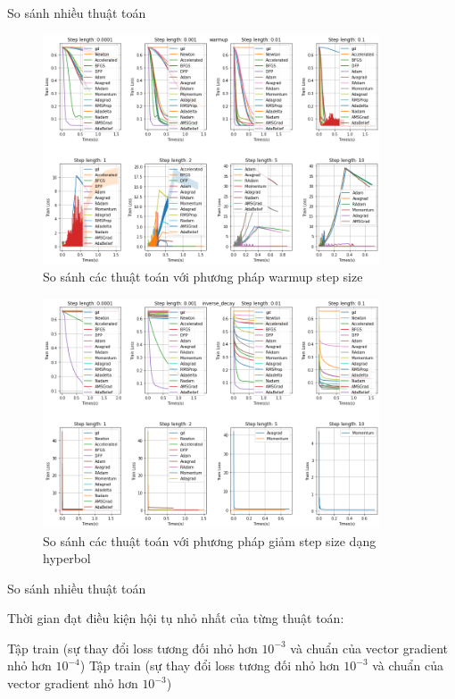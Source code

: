 \documentclass[10pt]{beamer}
\theoremstyle{remark}
\theoremstyle{definition}
\begin{document}
\begin{frame}[allowframebreaks]{So sánh nhiều thuật toán}
	\begin{figure}
		\centering
		\includegraphics[width=10cm]{Thanh/warmup-lr-step-op_time.png}
		\caption{So sánh các thuật toán với phương pháp warmup step size}
	\end{figure}

	\begin{figure}
		\centering
		\includegraphics[width=10cm]{Thanh/inverse-lr-step-op_time.png}
		\caption{So sánh các thuật toán với phương pháp giảm step size dạng hyperbol}
	\end{figure}
\end{frame}

\begin{frame}{So sánh nhiều thuật toán}

	Thời gian đạt điều kiện hội tụ nhỏ nhất của từng thuật toán:
	

	Tập train (sự thay đổi loss tương đối nhỏ hơn $10^{-3}$ và chuẩn của vector gradient nhỏ hơn $10^{-4}$)
	Tập train (sự thay đổi loss tương đối nhỏ hơn $10^{-3}$ và chuẩn của vector gradient nhỏ hơn $10^{-3}$)

\end{frame}
\end{document}
